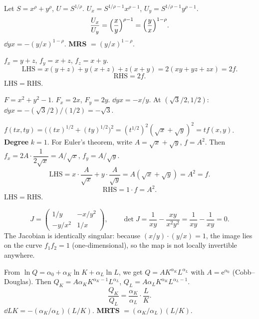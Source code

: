 \begin{solutions}
  \item Let $S=x^{\rho}+y^{\rho}$, $U=S^{1/\rho}$.
        $U_{x}=S^{1/\rho-1}x^{\rho-1}$, $U_{y}=S^{1/\rho-1}y^{\rho-1}$.
        \[
          \frac{U_{x}}{U_{y}}=\Bigl(\frac{x}{y}\Bigr)^{\rho-1}
            =\Bigl(\frac{y}{x}\Bigr)^{1-\rho} .
        \]
        $\dd{y}{x}=-(y/x)^{1-\rho}$. \textbf{MRS} $=(y/x)^{1-\rho}$.

  \item $f_{x}=y+z$, $f_{y}=x+z$, $f_{z}=x+y$.
        \[
          \mathrm{LHS}=x(y+z)+y(x+z)+z(x+y)=2(xy+yz+zx)=2f .
        \]
        \[
          \mathrm{RHS}=2f .
        \]
        $\mathrm{LHS}=\mathrm{RHS}$. \checkmark

  \item $F=x^{2}+y^{2}-1$. $F_{x}=2x$, $F_{y}=2y$. $\dd{y}{x}=-x/y$.
        At $(\sqrt{3}/2,1/2)$: $\dd{y}{x}=-(\sqrt{3}/2)/(1/2)=-\sqrt{3}$.
        \checkmark

  \item $f(tx,ty)=\bigl((tx)^{1/2}+(ty)^{1/2}\bigr)^{2}
        =(t^{1/2})^{2}(\sqrt{x}+\sqrt{y})^{2}=t f(x,y)$. \textbf{Degree}
        $k=1$. For Euler's theorem, write $A=\sqrt{x}+\sqrt{y}$,
        $f=A^{2}$. Then $f_{x}=2A\cdot\dfrac{1}{2\sqrt{x}}=A/\sqrt{x}$,
        $f_{y}=A/\sqrt{y}$.
        \[
          \mathrm{LHS}=x\cdot\frac{A}{\sqrt{x}}+y\cdot\frac{A}{\sqrt{y}}
            =A(\sqrt{x}+\sqrt{y})=A^{2}=f .
        \]
        \[
          \mathrm{RHS}=1\cdot f=A^{2} .
        \]
        $\mathrm{LHS}=\mathrm{RHS}$. \checkmark

  \item
        \[
          J=\begin{pmatrix} 1/y & -x/y^{2}\\ -y/x^{2} & 1/x\end{pmatrix},
          \qquad \det J=\frac{1}{xy}-\frac{xy}{x^{2}y^{2}}
            =\frac{1}{xy}-\frac{1}{xy}=0 .
        \]
        The Jacobian is identically singular: because
        $(x/y)\cdot(y/x)=1$, the image lies on the curve $f_{1}f_{2}=1$
        (one-dimensional), so the map is not locally invertible
        anywhere.

  \item From $\ln Q=\alpha_{0}+\alpha_{K}\ln K+\alpha_{L}\ln L$, we get
        $Q=AK^{\alpha_{K}}L^{\alpha_{L}}$ with $A=\mathrm{e}^{\alpha_{0}}$
        (Cobb--Douglas). Then $Q_{K}=A\alpha_{K}K^{\alpha_{K}-1}L^{\alpha_{L}}$,
        $Q_{L}=A\alpha_{L}K^{\alpha_{K}}L^{\alpha_{L}-1}$.
        \[
          \frac{Q_{K}}{Q_{L}}=\frac{\alpha_{K}}{\alpha_{L}}\cdot\frac{L}{K} .
        \]
        $\dd{L}{K}=-(\alpha_{K}/\alpha_{L})(L/K)$. \textbf{MRTS}
        $=(\alpha_{K}/\alpha_{L})(L/K)$.


\end{solutions}
